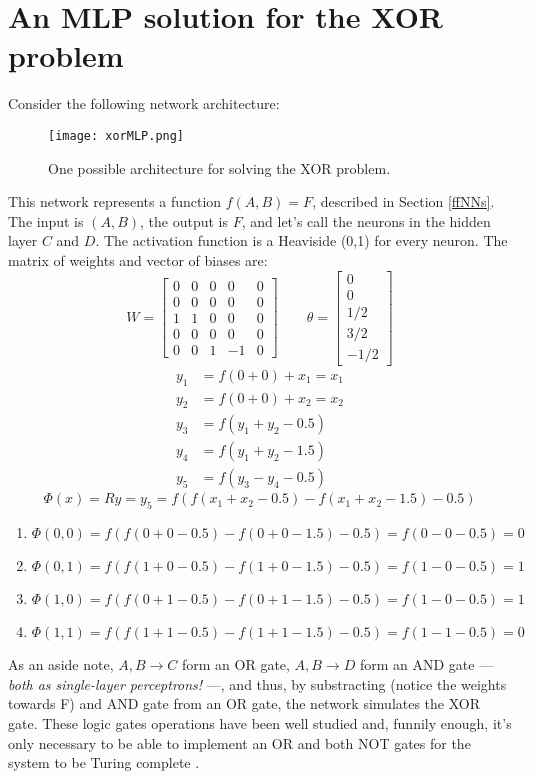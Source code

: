\documentclass[titlepage]{article}
\theoremstyle{plain}
\theoremstyle{definition}
\begin{document}
	\section*{}	\label{References}
	\newpage
	{}
	
	

	\appendix
	\newpage
	\addappheadtotoc
	\section{An MLP solution for the XOR problem} \label{xorMLP}
	Consider the following network architecture:
	\begin{figure}[H]
		\centering
		\texttt{[image: xorMLP.png]}
		\caption{One possible architecture for solving the XOR problem.}
		\label{fig:xorMLP1}
	\end{figure}
	This network represents a function $f(A,B) = F$, described in Section \ref{ffNNs}. The input is $(A,B)$, the output is $F$, and let's call the neurons in the hidden layer $C$ and $D$. The activation function is a Heaviside (0,1) for every neuron. The matrix of weights and vector of biases are:
	$$
	W = \begin{bmatrix}
	0 & 0 & 0 & 0 & 0 \\
	0 & 0 & 0 & 0 & 0 \\
	1 & 1 & 0 & 0 & 0 \\
	0 & 0 & 0 & 0 & 0 \\
	0 & 0 & 1 &-1 & 0
	\end{bmatrix}
	\qquad
	\theta = \begin{bmatrix}
	0 \\ 0 \\ 1/2 \\ 3/2 \\ -1/2 \end{bmatrix}
	$$
	\begin{align}
	y_1 & = f(0+0)+x_1 = x_1 \\
	y_2 & = f(0+0)+x_2 = x_2 \\
	y_3 & = f(y_1+y_2-0.5) \\
	y_4 & = f(y_1+y_2-1.5) \\
	y_5 & = f(y_3-y_4-0.5)
	\end{align}
	$$
	\Phi(x) = Ry = 
	y_5=
	f(f(x_1+x_2-0.5)-f(x_1+x_2-1.5)-0.5)
	$$
	\begin{enumerate}
		\item $\Phi(0,0) = f(f(0+0-0.5)-f(0+0-1.5)-0.5) = f(0-0-0.5) = 0$
		\item $\Phi(0,1) = f(f(1+0-0.5)-f(1+0-1.5)-0.5) = f(1-0-0.5) = 1$
		\item $\Phi(1,0) = f(f(0+1-0.5)-f(0+1-1.5)-0.5) = f(1-0-0.5) = 1$
		\item $\Phi(1,1) = f(f(1+1-0.5)-f(1+1-1.5)-0.5) = f(1-1-0.5) = 0$
	\end{enumerate}
	As an aside note, $A,B\to C$ form an OR gate, $A,B\to D$ form an AND gate --- \textit{both as single-layer perceptrons!} ---, and thus, by substracting (notice the weights towards F) and AND gate from an OR gate, the network simulates the XOR gate. These logic gates operations have been well studied and, funnily enough, it's only necessary to be able to implement an OR and both NOT gates for the system to be Turing complete \cite{Millican}.
	
\end{document}
